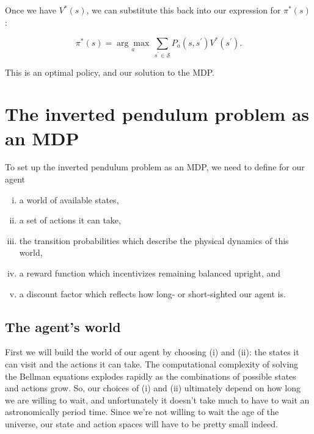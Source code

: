 \documentclass[12pt]{article}
\begin{document}

Once we have $V^*(s)$, we can substitute this back into our expression for $\pi^*(s)$:

\begin{equation}
\pi^*(s) = \underset{a}{\arg\max} \, \sum_{s^\prime \in \mathscr{S}} P_a(s, s^\prime) V^*(s^\prime).
\end{equation}

This is an optimal policy, and our solution to the MDP.

\section{The inverted pendulum problem as an MDP}

To set up the inverted pendulum problem as an MDP, we need to define for our agent

\begin{enumerate}[(i)]
\item{a world of available states,}
\item{a set of actions it can take,}
\item{the transition probabilities which describe the physical dynamics of this world,}
\item{a reward function which incentivizes remaining balanced upright, and}
\item{a discount factor which reflects how long- or short-sighted our agent is.}
\end{enumerate}

\subsection{The agent's world}

First we will build the world of our agent by choosing (i) and (ii): the states it can visit and the actions it can take. The computational complexity of solving the Bellman equations explodes rapidly as the combinations of possible states and actions grow. So, our choices of (i) and (ii) ultimately depend on how long we are willing to wait, and unfortunately it doesn't take much to have to wait an astronomically period time. Since we're not willing to wait the age of the universe, our state and action spaces will have to be pretty small indeed.
\end{document}
